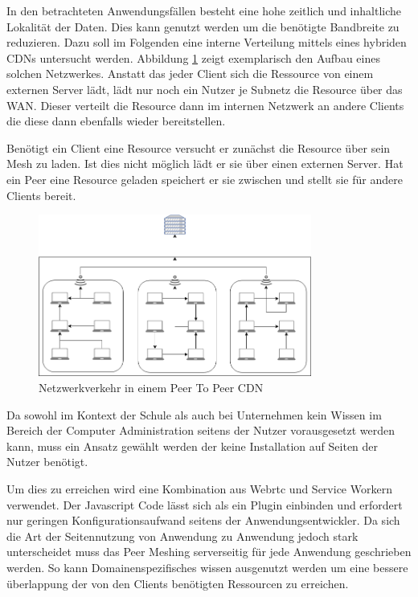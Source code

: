 In den betrachteten Anwendungsfällen besteht eine hohe zeitlich und inhaltliche Lokalität der Daten. Dies kann genutzt werden um die benötigte Bandbreite zu reduzieren. Dazu soll im Folgenden eine interne Verteilung mittels eines hybriden \pTp CDNs untersucht werden. Abbildung \ref{fig:mesh} zeigt exemplarisch den Aufbau eines solchen Netzwerkes. Anstatt das jeder Client sich die Ressource von einem externen Server lädt, lädt nur noch ein Nutzer je Subnetz die Resource über das WAN. Dieser verteilt die Resource dann im internen Netzwerk an andere Clients die diese dann ebenfalls wieder bereitstellen.

Benötigt ein Client eine Resource versucht er zunächst die Resource über sein \pTp Mesh zu laden. Ist dies nicht möglich lädt er sie über einen externen Server. Hat ein Peer eine Resource geladen speichert er sie zwischen und stellt sie für andere Clients bereit.

\begin{figure}[!h]
	\centering
	\includegraphics[width=0.8\textwidth]{figures/network_p2p}
	\caption[A Figure Short-Title]{Netzwerkverkehr in einem Peer To Peer CDN}
	\label{fig:mesh}
\end{figure}

Da sowohl im Kontext der Schule als auch bei Unternehmen kein Wissen im Bereich der Computer Administration seitens der Nutzer vorausgesetzt werden kann, muss ein Ansatz gewählt werden der keine Installation auf Seiten der Nutzer benötigt.

Um dies zu erreichen wird eine Kombination aus Webrtc und Service Workern verwendet. Der Javascript Code lässt sich als ein Plugin einbinden und erfordert nur geringen Konfigurationsaufwand seitens der Anwendungsentwickler. Da sich die Art der Seitennutzung von Anwendung zu Anwendung jedoch stark unterscheidet muss das Peer Meshing serverseitig für jede Anwendung geschrieben werden. So kann Domainenspezifisches wissen ausgenutzt werden um eine bessere überlappung der von den Clients benötigten Ressourcen zu erreichen. 

